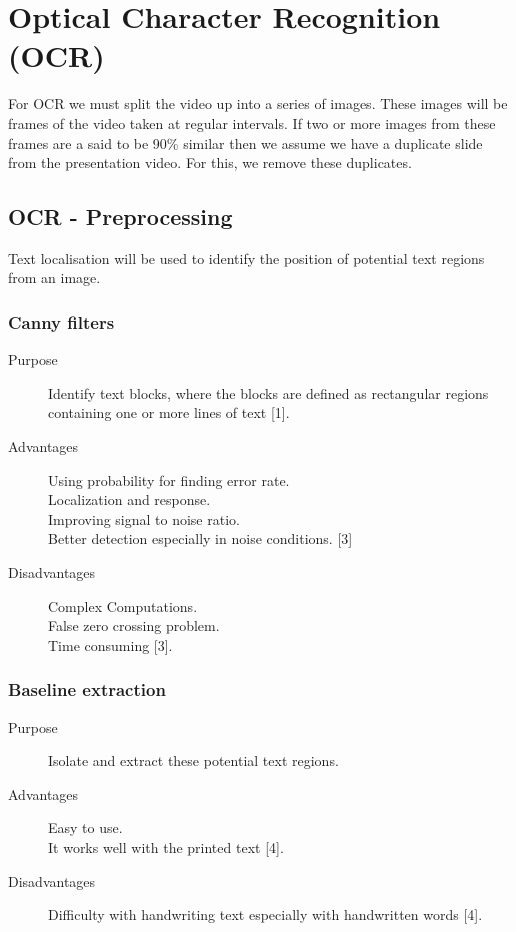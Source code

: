 \documentclass[a4paper,12pt]{article}
\begin{document}
\section{Optical Character Recognition (OCR)}
For OCR we must split the video up into a series of images. These images will be frames of the video taken at regular intervals. If two or more images from these frames are a said to be 90\% similar then we assume we have a duplicate slide from the presentation video. For this, we remove these duplicates.

\subsection{OCR - Preprocessing}
Text localisation will be used to identify the position of potential text regions from an image.
\subsubsection{Canny filters}
\begin{description}

\item[Purpose] Identify text blocks, where the blocks are defined as rectangular regions containing one or more lines of text [1].
\item[Advantages] Using probability for finding error rate.
\\ Localization and response.
\\ Improving signal to noise ratio.
\\ Better detection especially in noise conditions. [3]
\item[Disadvantages] Complex Computations.
\\ False zero crossing problem.
\\ Time consuming [3].
\end{description}

\subsubsection{Baseline extraction}
\begin{description}
\item[Purpose] Isolate and extract these potential text regions.
\item[Advantages] Easy to use.
\\ It works well with the printed text [4].
\item[Disadvantages] Difficulty with handwriting text especially with handwritten words [4].
\end{description}
\end{document}

